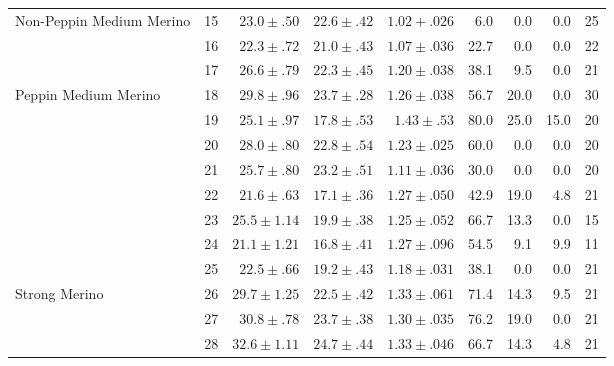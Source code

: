 \begin{landscape}
\begin{table}
\begin{tabular}{l|r|rrr|rrr|r}
Non-Peppin Medium Merino &  15 &  $23.0\pm.50$   & $22.6\pm.42$  & $1.02+.026  $  & 6.0   & 0.0  & 0.0  & 25 \\
                       & 16    &  $22.3\pm.72$   & $21.0\pm.43$  & $1.07\pm.036$  & 22.7  & 0.0  & 0.0  & 22 \\
                       & 17    &  $26.6\pm.79$   & $22.3\pm.45$  & $1.20\pm.038$  & 38.1  & 9.5  & 0.0  & 21 \\ \hline

Peppin Medium Merino   & 18    &  $29.8\pm.96$   & $23.7\pm.28$  & $1.26\pm.038$  & 56.7  & 20.0 & 0.0  & 30 \\
                       & 19    &  $25.1\pm.97$   & $17.8\pm.53$  & $1.43\pm.53 $  & 80.0  & 25.0 & 15.0 & 20 \\
                       & 20    &  $28.0\pm.80$   & $22.8\pm.54$  & $1.23\pm.025$  & 60.0  & 0.0  & 0.0  & 20 \\
                       & 21    &  $25.7\pm.80$   & $23.2\pm.51$  & $1.11\pm.036$  & 30.0  & 0.0  & 0.0  & 20 \\
                       & 22    &  $21.6\pm.63$   & $17.1\pm.36$  & $1.27\pm.050$  & 42.9  & 19.0 & 4.8  & 21 \\
                       & 23    &  $25.5\pm1.14$ &  $19.9\pm.38$  & $1.25\pm.052$  & 66.7  & 13.3 & 0.0  & 15 \\
                       & 24    &  $21.1\pm1.21$ &  $16.8\pm.41$  & $1.27\pm.096$  & 54.5  & 9.1  & 9.9  & 11 \\
                       & 25    &  $22.5\pm.66$   & $19.2\pm.43$  & $1.18\pm.031$  & 38.1  & 0.0  & 0.0  & 21 \\ \hline

Strong Merino          & 26    &  $29.7\pm1.25$ &  $22.5\pm.42$  & $1.33\pm.061$  & 71.4  & 14.3 & 9.5  & 21 \\
                       & 27    &  $30.8\pm.78 $  & $23.7\pm.38$  & $1.30\pm.035$  & 76.2  & 19.0 & 0.0  & 21 \\
                       & 28    &  $32.6\pm1.11$ &  $24.7\pm.44$  & $1.33\pm.046$  & 66.7  & 14.3 & 4.8  & 21 \\ \hline

\end{tabular}
\end{table}
\end{landscape}

%
